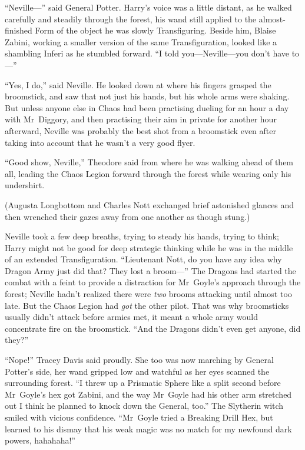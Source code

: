 “Neville—” said General Potter. Harry’s voice was a little distant, as he
walked carefully and steadily through the forest, his wand still applied to the
almost-finished Form of the object he was slowly Transfiguring. Beside him,
Blaise Zabini, working a smaller version of the same Transfiguration, looked
like a shambling Inferi as he stumbled forward. “I told you—Neville—you
don’t have to—”

“Yes, I do,” said Neville. He looked down at where his fingers grasped the
broomstick, and saw that not just his hands, but his whole arms were shaking.
But unless anyone else in Chaos had been practising dueling for an hour a day
with Mr~Diggory, and then practising their aim in private for another hour
afterward, Neville was probably the best shot from a broomstick even after
taking into account that he wasn’t a very good flyer.

“Good show, Neville,” Theodore said from where he was walking ahead of them
all, leading the Chaos Legion forward through the forest while wearing only his
undershirt.

(Augusta Longbottom and Charles Nott exchanged brief astonished glances and
then wrenched their gazes away from one another as though stung.)

Neville took a few deep breaths, trying to steady his hands, trying to think;
Harry might not be good for deep strategic thinking while he was in the middle
of an extended Transfiguration. “Lieutenant Nott, do you have any idea why
Dragon Army just did that? They lost a broom—” The Dragons had started the
combat with a feint to provide a distraction for Mr~Goyle’s approach through
the forest; Neville hadn’t realized there were \emph{two} brooms attacking
until almost too late. But the Chaos Legion had \emph{got} the other pilot.
That was why broomsticks usually didn’t attack before armies met, it meant a
whole army would concentrate fire on the broomstick. “And the Dragons didn’t
even get anyone, did they?”

“Nope!” Tracey Davis said proudly. She too was now marching by General Potter’s
side, her wand gripped low and watchful as her eyes scanned the surrounding
forest. “I threw up a Prismatic Sphere like a split second before Mr~Goyle’s
hex got Zabini, and the way Mr~Goyle had his other arm stretched out I think
he planned to knock down the General, too.” The Slytherin witch smiled with
vicious confidence. “Mr~Goyle tried a Breaking Drill Hex, but learned to his
dismay that his weak magic was no match for my newfound dark powers, hahahaha!”

